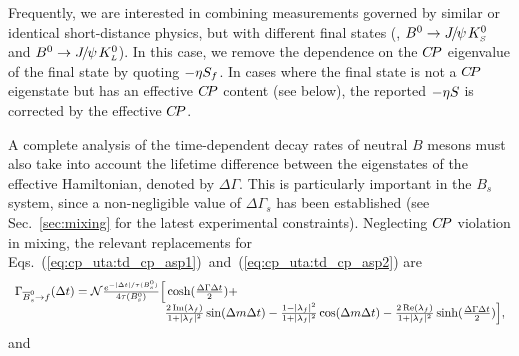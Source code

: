 Frequently, we are interested in combining measurements 
governed by similar or identical short-distance physics,
but with different final states
(\eg, $B^0 \to {J\mskip -3mu/\mskip -2mu\psi\mskip 2mu} K^0_{\scriptscriptstyle S}$ and $B^0 \to {J\mskip -3mu/\mskip -2mu\psi\mskip 2mu} K^0_{\scriptscriptstyle L}$).
In this case, we remove the dependence on the $C\!P$ eigenvalue 
of the final state by quoting $-{\eta} S_f$.
In cases where the final state is not a $C\!P$ eigenstate but has
an effective $C\!P$ content (see below),
the reported $-{\eta} S$ is corrected by the effective $C\!P$.

\label{sec:cp_uta:notations:Bs}

A complete analysis of the time-dependent decay rates of 
neutral $B$ mesons must also take into account the lifetime difference
between the eigenstates of the effective Hamiltonian, 
denoted by $\Delta \Gamma$.
This is particularly important in the $B_s$ system,
since a non-negligible value of $\Delta \Gamma_s$ has been established
(see Sec.~\ref{sec:mixing} for the latest experimental constraints).
Neglecting $C\!P$ violation in mixing,
the relevant replacements for 
Eqs.~(\ref{eq:cp_uta:td_cp_asp1})~and~(\ref{eq:cp_uta:td_cp_asp2}) 
are~\cite{Dunietz:2000cr}
\begin{equation}
  \label{eq:cp_uta:td_cp_bs_asp1}
  \begin{array}{lcr}
    \mc{2}{l}{
      \Gamma_{\Bsbar \to f} (\Delta t) = 
      {\cal N} %
      \frac{e^{-| \Delta t | / \tau(\Bs)}}{4\tau(\Bs)}
      \Big[ 
      \cosh(\frac{\Delta \Gamma \Delta t}{2}) +
    } & \hspace{40mm} \\
    \hspace{40mm} &
    \mc{2}{r}{
      \frac{2\, \Im(\lambda_f)}{1 + |\lambda_f|^2} \sin(\Delta m \Delta t) -
      \frac{1 - |\lambda_f|^2}{1 + |\lambda_f|^2} \cos(\Delta m \Delta t) -
      \frac{2\, \Re(\lambda_f)}{1 + |\lambda_f|^2} \sinh(\frac{\Delta \Gamma \Delta t}{2})
      \Big],
    } \\
  \end{array}
\end{equation}
and
